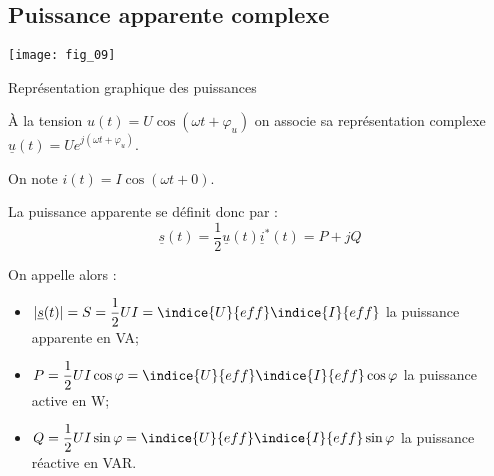 \subsection{Puissance apparente complexe}




\begin{marginfigure}
\texttt{[image: fig\_09]}
\caption{Représentation graphique des puissances\label{fig:ge:cours:fig_09}}
\end{marginfigure}

\begin{defi}
À la tension $u(t)=U\cos\left( \omega t + \varphi_u\right)$ on associe sa représentation complexe 
$\underline{u}(t)=Ue^{j\left( \omega t + \varphi_u\right)}$.

On note  $i(t)=I\cos\left( \omega t + 0\right)$.%

La puissance apparente se définit donc par : 
$$ \underline{s}(t) = \dfrac{1}{2}\underline{u}(t)\underline{i}^*(t) = P + j Q $$ 
%
%

On appelle alors :
\begin{itemize}
\item $|\underline{s}(t)| = S = \dfrac{1}{2}UI = \indice{U}{eff}\indice{I}{eff}$ la puissance apparente en \si{VA};
\item $P = \dfrac{1}{2}UI\cos\varphi = \indice{U}{eff}\indice{I}{eff} \cos\varphi$ la puissance active en \si{W};
\item $Q = \dfrac{1}{2}UI\sin\varphi = \indice{U}{eff}\indice{I}{eff} \sin\varphi$ la puissance réactive en \si{VAR}.
\end{itemize}
\end{defi}





